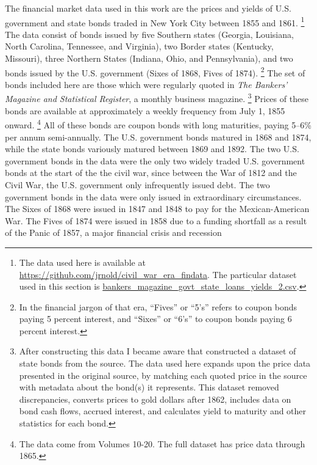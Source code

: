 The financial market data used in this work are the prices and yields of U.S. government and state bonds traded in New York City between 1855 and 1861.%
\footnote{
  The data used here is available at \url{https://github.com/jrnold/civil_war_era_findata}.
  The particular dataset used in this section is \href{https://github.com/jrnold/civil_war_era_findata/blob/master/data/bankers_magazine_govt_state_loans_yields_2.csv}{bankers\_magazine\_govt\_state\_loans\_yields\_2.csv}.
}
The data consist of bonds issued by five Southern states (Georgia, Louisiana, North Carolina, Tennessee, and Virginia), two Border states (Kentucky, Missouri), three Northern States (Indiana, Ohio, and Pennsylvania), and two bonds issued by the U.S. government (Sixes of 1868, Fives of 1874).%
\footnote{In the financial jargon of that era, ``Fives'' or ``5's'' refers to coupon bonds paying 5 percent interest, and ``Sixes'' or ``6's'' to coupon bonds paying 6 percent interest.}
The set of bonds included here are those which were regularly quoted in \textit{The Bankers' Magazine and Statistical Register}, a monthly business magazine.%
\footnote{After constructing this data I became aware that \textcite{DwyerHaferWeber1999} constructed a dataset of state bonds from the source.
  The data used here expands upon the price data presented in the original source, by matching each quoted price in the source with metadata about the bond(s) it represents.
  This dataset removed discrepancies, converts prices to gold dollars after 1862, includes data on bond cash flows, accrued interest, and calculates yield to maturity and other statistics for each bond.
}
Prices of these bonds are available at approximately a weekly frequency from July  1, 1855 onward.%
\footnote{The data come from Volumes 10-20. The full dataset has price data through 1865.}
All of these bonds are coupon bonds with long maturities, paying 5--6\% per annum semi-annually.
The U.S. government bonds matured in 1868 and 1874, while the state bonds variously matured between 1869 and 1892.
The two U.S. government bonds in the data were the only two widely traded U.S. government bonds at the start of the the civil war, since between the War of 1812 and the Civil War, the U.S. government only infrequently issued debt.
The two government bonds in the data were only issued in extraordinary circumstances. 
The Sixes of 1868 were issued in 1847 and 1848 to pay for the Mexican-American War.
The Fives of 1874 were issued in 1858 due to a funding shortfall as a result of the Panic of 1857, a major financial crisis and recession  \parencites[297-302]{HomerSylla2005}[72-73,76]{DeKnight1900}
